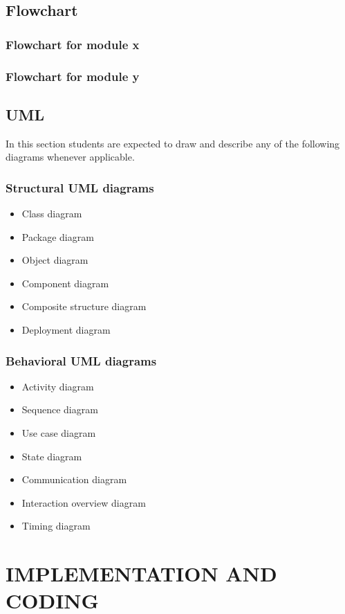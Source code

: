 \documentclass[12pt, final]{report}
\begin{document}
\section{Flowchart}
	\subsection{Flowchart for module x}
	\subsection{Flowchart for module y}

\section{UML}
In this section students are expected to draw and describe any of the following diagrams whenever applicable.
	\subsection{Structural UML diagrams}
	\begin{itemize}
		\item Class diagram
		\item Package diagram
		\item Object diagram
		\item Component diagram
		\item Composite structure diagram
		\item Deployment diagram
	\end{itemize}

	\subsection{Behavioral UML diagrams}
	\begin{itemize}
		\item Activity diagram
		\item Sequence diagram
		\item Use case diagram
		\item State diagram
		\item Communication diagram
		\item Interaction overview diagram
		\item Timing diagram
	\end{itemize}



\chapter{IMPLEMENTATION AND CODING}
\end{document}
